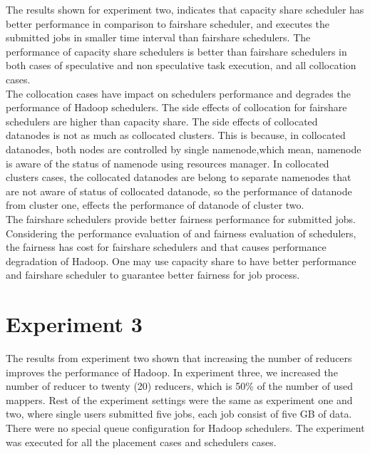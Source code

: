 The results shown for experiment two, indicates that capacity share scheduler has better performance in comparison to fairshare scheduler, and executes the submitted jobs in smaller time interval than fairshare schedulers. The performance of capacity share schedulers is better than fairshare schedulers in both cases of speculative and non speculative task execution, and all collocation cases.\\

The collocation cases have impact on schedulers performance and degrades the performance of Hadoop schedulers. The side effects of collocation for fairshare schedulers are higher than capacity share. The side effects of collocated datanodes is not as much as collocated clusters. This is because, in collocated datanodes, both nodes are controlled by single namenode,which mean, namenode is aware of the status of namenode using resources manager. In collocated clusters cases, the collocated datanodes are belong to separate namenodes that are not aware of status of collocated datanode, so the performance of datanode from cluster one, effects the performance of datanode of cluster two.\\  
 

 The fairshare schedulers provide better fairness performance for submitted jobs. Considering the performance evaluation of and fairness evaluation of schedulers, the fairness has cost for fairshare schedulers and that causes performance degradation of Hadoop. One may use capacity share to have better performance and fairshare scheduler to guarantee better fairness for job process.\\




\section{Experiment 3}
The results from experiment two shown that increasing the number of reducers improves the performance of Hadoop. In experiment three, we increased the number of reducer to twenty (20) reducers, which is 50\% of the number of used mappers. Rest of the experiment settings were the same as experiment one and two, where single users submitted five jobs, each job consist of five GB of data. There were no special queue configuration for Hadoop schedulers. The experiment was executed for all the placement cases and schedulers cases. 
  
